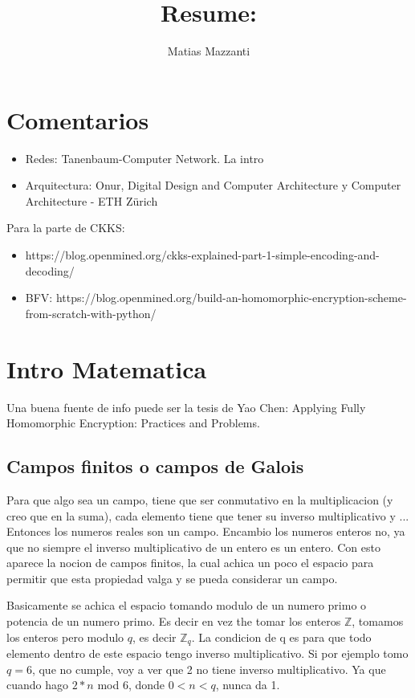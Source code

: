 \documentclass[12pt, oneside]{article}
\title{Resume: }
\author{Matias Mazzanti}
\date{}
\newcommand{\Z}{\mathbb{Z}}
\begin{document}
\maketitle
\tableofcontents

\vspace{.25in}
\section{Comentarios}
\begin{itemize}
  \item Redes: Tanenbaum-Computer Network. La intro
  \item Arquitectura: Onur, Digital Design and Computer Architecture y Computer Architecture - ETH Zürich
\end{itemize}

Para la parte de CKKS:
\begin{itemize}
  \item https://blog.openmined.org/ckks-explained-part-1-simple-encoding-and-decoding/
  \item BFV: https://blog.openmined.org/build-an-homomorphic-encryption-scheme-from-scratch-with-python/
\end{itemize}
\section{Intro Matematica}
Una buena fuente de info puede ser la tesis de Yao Chen: Applying Fully Homomorphic
Encryption: Practices and Problems.

\subsection{Campos finitos o campos de Galois}
Para que algo sea un campo, tiene que ser conmutativo en la multiplicacion (y creo que en la suma),
cada elemento tiene que tener su inverso multiplicativo y ...
Entonces los numeros reales son un campo.
Encambio los numeros enteros no, ya que no siempre el inverso multiplicativo de un entero
es un entero.
Con esto aparece la nocion de campos finitos, la cual achica un poco el espacio para
permitir que esta propiedad valga y se pueda considerar un campo.

Basicamente se achica el espacio tomando modulo de un numero primo o potencia de un
numero primo.
Es decir en vez the tomar los enteros $\Z$, tomamos los enteros pero modulo $q$,
es decir $\Z_q$.
La condicion de q es para que todo elemento dentro de este espacio tengo inverso multiplicativo.
Si por ejemplo tomo $q=6$, que no cumple, voy a ver que 2 no tiene inverso multiplicativo.
Ya que cuando hago $2*n$ mod 6, donde $0 < n < q$, nunca da 1.
\end{document}
